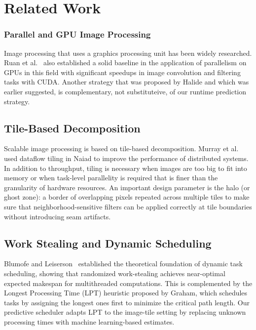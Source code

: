 \documentclass[acmsmall]{acmart}
\begin{document}
\section{Related Work}
\label{sec:related}

\subsubsection{Parallel and GPU Image Processing}

Image processing that uses a graphics processing unit has been widely researched. 
Ruan et al.~\cite{Ruan2019} also established a solid baseline in the application of parallelism on GPUs in this field with significant speedups in image convolution and filtering tasks with CUDA. 
Another strategy that was proposed by Halide and which was earlier suggested, is complementary, not substituteive, of our runtime prediction strategy.

\subsection{Tile-Based Decomposition}

Scalable image processing is based on tile-based decomposition. 
Murray et al.~\cite{Murray2013} used dataflow tiling in Naiad to improve the performance of distributed systems. 
In addition to throughput, tiling is necessary when images are too big to fit into memory or when task-level parallelity is required that is finer than the granularity of hardware resources. 
An important design parameter is the halo (or ghost zone): a border of overlapping pixels repeated across multiple tiles to make sure that neighborhood-sensitive filters can be applied correctly at tile boundaries without introducing seam artifacts.

\subsection{Work Stealing and Dynamic Scheduling}

Blumofe and Leiserson~\cite{Blumofe1999} established the theoretical foundation of dynamic task scheduling, showing that randomized work-stealing achieves near-optimal expected makespan for multithreaded computations. 
This is complemented by the Longest Processing Time (LPT) heuristic proposed by Graham, which schedules tasks by assigning the longest ones first to minimize the critical path length. 
Our predictive scheduler adapts LPT to the image-tile setting by replacing unknown processing times with machine learning-based estimates.
\end{document}
